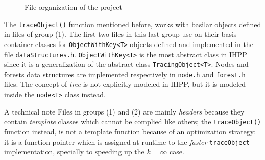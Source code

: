 \documentclass[a4paper,10pt]{report}
\begin{document}
\begin{figure}[H]


\caption{File organization of the project}
\label{proj_files}

\end{figure}

\noindent
The \verb|traceObject()| function mentioned before, works with basilar objects
defined in files of group (1). The first two files in this last group use on their basis
container classes for \verb|ObjectWithKey<T>| objects defined and implemented
in the file \verb|dataStructures.h|.
\verb|ObjectWithKey<T>| is the most abstract class in IHPP since it is a generalization of the abstract class \verb|TracingObject<T>|.
Nodes and forests data structures are implemented respectively in \verb|node.h| and \verb|forest.h| files. The concept of \emph{tree} is not explicitly modeled in IHPP, but it is
modeled inside the \verb|node<T>| class instead.
\begin{paragraph}{A technical note}
Files in groups (1) and (2)
are mainly \emph{headers} because they
contain \emph{template} classes which cannot be complied like others;
the \verb|traceObject()| function instead, is not a template function because of
an optimization strategy: it is a function pointer which is assigned at runtime
to the \emph{faster} \verb|traceObject| implementation, specially to speeding up
the $k=\infty$ case.
\end{paragraph}
\end{document}
